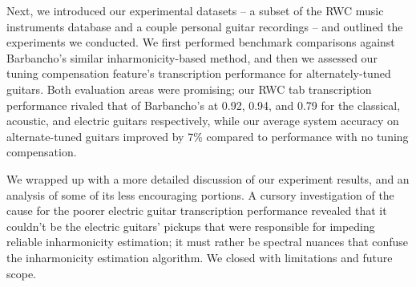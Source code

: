\documentclass[12pt]{cmuthesis}
\begin{document}
Next, we introduced our experimental datasets -- a subset of the RWC music instruments database and a couple personal guitar recordings -- and outlined the experiments we conducted. We first performed benchmark comparisons against Barbancho's similar inharmonicity-based method, and then we assessed our tuning compensation feature's transcription performance for alternately-tuned guitars. Both evaluation areas were promising; our RWC tab transcription performance rivaled that of Barbancho's at 0.92, 0.94, and 0.79 for the classical, acoustic, and electric guitars respectively, while our average system accuracy on alternate-tuned guitars improved by 7\% compared to performance with no tuning compensation.

We wrapped up with a more detailed discussion of our experiment results, and an analysis of some of its less encouraging portions. A cursory investigation of the cause for the poorer electric guitar transcription performance revealed that it couldn't be the electric guitars' pickups that were responsible for impeding reliable inharmonicity estimation; it must rather be spectral nuances that confuse the inharmonicity estimation algorithm. We closed with limitations and future scope.



\end{document}
